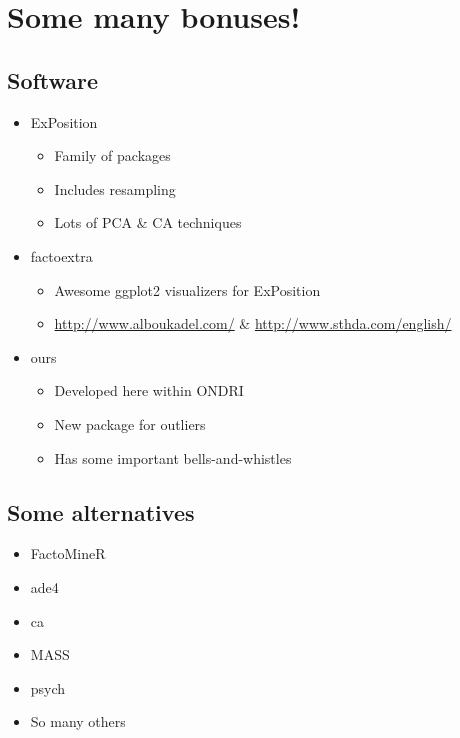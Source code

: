 \documentclass[
  ignorenonframetext,
]{beamer}
\providecommand{\tightlist}{%
  \setlength{\itemsep}{0pt}\setlength{\parskip}{0pt}}
\begin{document}
\hypertarget{some-many-bonuses}{%
\section{Some many bonuses!}\label{some-many-bonuses}}

\hypertarget{software}{%
\subsection{Software}\label{software}}

\begin{itemize}[<+->]
\tightlist
\item
  ExPosition

  \begin{itemize}[<+->]
  \tightlist
  \item
    Family of packages
  \item
    Includes resampling
  \item
    Lots of PCA \& CA techniques
  \end{itemize}
\item
  factoextra

  \begin{itemize}[<+->]
  \tightlist
  \item
    Awesome ggplot2 visualizers for ExPosition
  \item
    \url{http://www.alboukadel.com/} \&
    \url{http://www.sthda.com/english/}
  \end{itemize}
\item
  ours

  \begin{itemize}[<+->]
  \tightlist
  \item
    Developed here within ONDRI
  \item
    New package for outliers
  \item
    Has some important bells-and-whistles
  \end{itemize}
\end{itemize}

\hypertarget{some-alternatives}{%
\subsection{Some alternatives}\label{some-alternatives}}

\begin{itemize}[<+->]
\tightlist
\item
  FactoMineR
\item
  ade4
\item
  ca
\item
  MASS
\item
  psych
\item
  So many others
\end{itemize}
\end{document}
